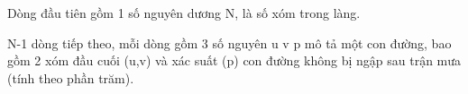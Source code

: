 Dòng đầu tiên gồm 1 số nguyên dương N, là số xóm trong làng.

N-1 dòng tiếp theo, mỗi dòng gồm 3 số nguyên u v p mô tả một con đường, bao gồm 2 xóm đầu cuối (u,v) và xác suất (p) con đường không bị ngập sau trận mưa (tính theo phần trăm).